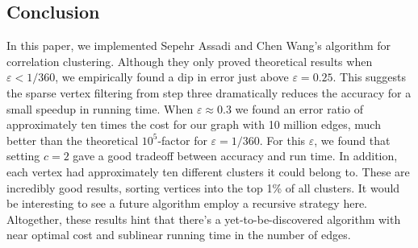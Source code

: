 \documentclass[
]{article}
\begin{document}
\hypertarget{conclusion}{%
  \subsection{Conclusion}\label{conclusion}}

In this paper, we implemented Sepehr Assadi and Chen Wang's algorithm for correlation clustering. Although they only proved theoretical results when $\varepsilon < 1/360$, we empirically found a dip in error just above $\varepsilon = 0.25$. This suggests the sparse vertex filtering from step three dramatically reduces the accuracy for a small speedup in running time. When $\varepsilon\approx 0.3$ we found an error ratio of approximately ten times the cost for our graph with 10 million edges, much better than the theoretical $10^5$-factor for $\varepsilon = 1/360$. For this $\varepsilon$, we found that setting $c = 2$ gave a good tradeoff between accuracy and run time. In addition, each vertex had approximately ten different clusters it could belong to. These are incredibly good results, sorting vertices into the top 1\% of all clusters. It would be interesting to see a future algorithm employ a recursive strategy here. Altogether, these results hint that there's a yet-to-be-discovered algorithm with near optimal cost and sublinear running time in the number of edges.
\nocite{*}


\end{document}

